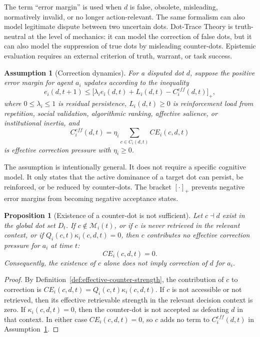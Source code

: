 \documentclass[11pt]{article}
\newtheorem{assumption}{Assumption}
\newtheorem{proposition}{Proposition}
\theoremstyle{remark}
\begin{document}
The term ``error margin'' is used when $d$ is false, obsolete,
misleading, normatively invalid, or no longer action-relevant. The same
formalism can also model legitimate dispute between two uncertain dots.
Dot-Trace Theory is truth-neutral at the level of mechanics: it can model
the correction of false dots, but it can also model the suppression of
true dots by misleading counter-dots. Epistemic evaluation requires an
external criterion of truth, warrant, or task success.

\begin{assumption}[Correction dynamics]\label{ass:correction-dynamics}
For a disputed dot $d$, suppose the positive error margin for agent $a_i$
updates according to the inequality
$$
e_i(d,t+1)\leq
\big[\lambda_i e_i(d,t)+L_i(d,t)-C_i^{eff}(d,t)\big]_+,
$$
where $0\leq\lambda_i\leq1$ is residual persistence,
$L_i(d,t)\geq0$ is reinforcement load from repetition, social validation,
algorithmic ranking, affective salience, or institutional inertia, and
$$
C_i^{eff}(d,t)=\eta_i\sum_{c\in C_i(d,t)}CE_i(c,d,t)
$$
is effective correction pressure with $\eta_i\geq0$.
\end{assumption}

The assumption is intentionally general. It does not require a specific
cognitive model. It only states that the active dominance of a target dot
can persist, be reinforced, or be reduced by counter-dots. The bracket
$[\cdot]_+$ prevents negative error margins from becoming negative
acceptance states.

\begin{proposition}[Existence of a counter-dot is not sufficient]\label{prop:counter-dot-existence-not-sufficient}
Let $c\dashv d$ exist in the global dot set $D_t$. If $c\notin \mathcal M_i(t)$,
or if $c$ is never retrieved in the relevant context, or if
$Q_i(c,t)\kappa_i(c,d,t)=0$, then $c$ contributes no effective
correction pressure for $a_i$ at time $t$:
$$
CE_i(c,d,t)=0.
$$
Consequently, the existence of $c$ alone does not imply correction of
$d$ for $a_i$.
\end{proposition}

\begin{proof}
By Definition~\ref{def:effective-counter-strength}, the contribution of
$c$ to correction is $CE_i(c,d,t)=Q_i(c,t)\kappa_i(c,d,t)$. If $c$ is not
accessible or not retrieved, then its effective retrievable strength in
the relevant decision context is zero. If $\kappa_i(c,d,t)=0$, then the
counter-dot is not accepted as defeating $d$ in that context. In either
case $CE_i(c,d,t)=0$, so $c$ adds no term to $C_i^{eff}(d,t)$ in
Assumption~\ref{ass:correction-dynamics}.
\end{proof}
\end{document}

